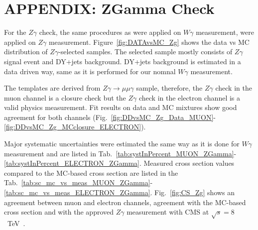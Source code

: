\section{APPENDIX: ZGamma Check}
\label{sec:ZgCheck}

For the $Z\gamma$ check, the same procedures as were applied on $W\gamma$ measurement, were applied on $Z\gamma$ measurement. Figure~\ref{fig:DATAvsMC_Zg} shows the data vs MC distribution of $Z\gamma$-selected samples. The selected sample mostly consists of $Z\gamma$ signal event and DY+jets background. DY+jets background is estimated in a data driven way, same as it is performed for our nomnal $W\gamma$ measurement.  

The templates are derived from $Z\gamma\rightarrow\mu\mu\gamma$ sample, therefore, the $Z\gamma$ check in the muon channel is a closure check but the $Z\gamma$ check in the electron channel is a valid physics measurement. Fit results on data and MC mixtures show good agreement for both channels (Fig.~\ref{fig:DDvsMC_Zg_Data_MUON}-\ref{fig:DDvsMC_Zg_MCclosure_ELECTRON}).

Major systematic uncertainties were estimated the same way as it is done for $W\gamma$ measurement and are listed in Tab.~\ref{tab:systInPercent_MUON_ZGamma}-\ref{tab:systInPercent_ELECTRON_ZGamma}. Measured cross section values compared to the MC-based cross section are listed in the Tab.~\ref{tab:sc_mc_vs_meas_MUON_ZGamma}-\ref{tab:sc_mc_vs_meas_ELECTRON_ZGamma}. Fig.~\ref{fig:CS_Zg} shows an agreement between muon and electron channels, agreement with the MC-based cross section and with the approved $Z\gamma$ measurement with CMS at $\sqrt{s}=8$~TeV~\cite{ref_Zg8TeV}.


